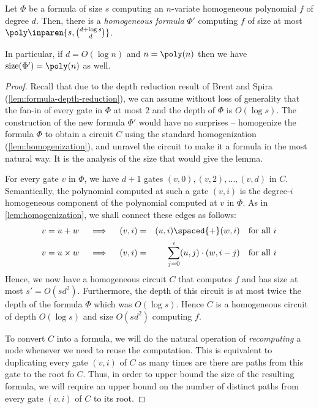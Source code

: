 \begin{lemma}\label{lem:formula-homogenization} Let $\Phi$ be a formula of size $s$ computing an $n$-variate homogeneous polynomial $f$ of degree $d$. Then, there is a \emph{homogeneous formula} $\Phi'$ computing $f$ of size at most $\poly\inparen{s,\binom{d+\log s}{d}}$. 

In particular, if $d = O(\log n)$ and $n = \poly(n)$ then we have $\mathrm{size}(\Phi') = \poly(n)$ as well. 
\end{lemma}
\begin{proof}
Recall that due to the depth reduction result of Brent and Spira (\autoref{lem:formula-depth-reduction}), we can assume without loss of generality that the fan-in of every gate in $\Phi$ at most $2$ and the depth of $\Phi$ is $O(\log s)$.
The construction of the new formula $\Phi'$ would have no surprises -- homogenize the formula $\Phi$ to obtain a circuit $C$ using the standard homogenization (\autoref{lem:homogenization}), and unravel the circuit to make it a formula in the most natural way. It is the analysis of the size that would give the lemma. 

\medskip

For every gate $v$ in $\Phi$, we have $d+1$ gates $(v, 0), (v, 2), \ldots, (v, d)$ in $C$.
Semantically, the polynomial computed at such a gate $(v, i)$ is the degree-$i$ homogeneous component of the polynomial computed at $v$ in $\Phi$. As in \autoref{lem:homogenization}, we shall connect these edges as follows:
\begin{eqnarray*}
v = u+w\quad\implies\quad (v, i) &=& (u, i) \spaced{+} (w,i)\quad\text{for all $i$}\\
v = u\times w\quad\implies\quad (v, i) &=& \sum_{j=0}^i (u,j)\cdot (w, {i-j}) \quad\text{for all $i$}
\end{eqnarray*}
Hence, we now have a homogeneous circuit $C$ that computes $f$ and has size at most $s' = O(sd^2)$. Furthermore, the depth of this circuit is at most twice the depth of the formula $\Phi$ which was $O(\log s)$. Hence $C$ is a homogeneous circuit of depth $O(\log s)$ and size $O(sd^2)$ computing $f$. 

To convert $C$ into a formula, we will do the natural operation of \emph{recomputing} a node whenever we need to reuse the computation. This is equivalent to duplicating every gate $(v,i)$ of $C$ as many times are there are paths from this gate to the root fo $C$.
Thus, in order to upper bound the size of the resulting formula, we will require an upper bound on the number of distinct paths from every gate $(v,i)$ of $C$ to its root.


\end{proof}
